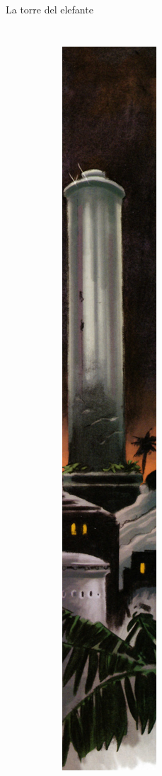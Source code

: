\begin{frame}{La torre del elefante}
\begin{columns}
\begin{figure}[htp]
\begin{subfigure}[b]{0.08\textwidth}
   \includegraphics[width=\textwidth]{img/torre/DH}

\end{subfigure}
\end{figure}
\end{columns}
\end{frame}
